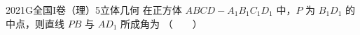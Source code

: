 
\begin{problem}{2021}{G}{全国I卷（理）}{5}{立体几何}
在正方体 $ ABCD-A_1B_1C_1D_1 $ 中，$ P $ 为 $ B_1D_1 $ 的中点，则直线 $ PB $ 与 $ AD_1 $ 所成角为 \hspace{1cm}（　　）
\begin{choices}
\end{choices}
\end{problem}

\begin{answer}

\end{answer}

\begin{solutions}

\end{solutions}